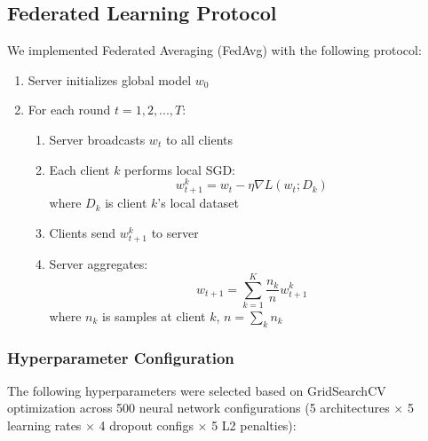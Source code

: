 \documentclass[conference]{IEEEtran}
\begin{document}
\subsection{Federated Learning Protocol}

We implemented Federated Averaging (FedAvg) \cite{mcmahan2017communication} with the following protocol:

\begin{enumerate}
    \item Server initializes global model $w_0$
    \item For each round $t = 1, 2, ..., T$:
    \begin{enumerate}
        \item Server broadcasts $w_t$ to all clients
        \item Each client $k$ performs local SGD:
        \begin{equation}
            w_{t+1}^k = w_t - \eta \nabla L(w_t; D_k)
        \end{equation}
        where $D_k$ is client $k$'s local dataset
        \item Clients send $w_{t+1}^k$ to server
        \item Server aggregates:
        \begin{equation}
            w_{t+1} = \sum_{k=1}^{K} \frac{n_k}{n} w_{t+1}^k
        \end{equation}
        where $n_k$ is samples at client $k$, $n = \sum_k n_k$
    \end{enumerate}
\end{enumerate}

\subsubsection{Hyperparameter Configuration}

The following hyperparameters were selected based on GridSearchCV optimization across 500 neural network configurations (5 architectures $\times$ 5 learning rates $\times$ 4 dropout configs $\times$ 5 L2 penalties):
\end{document}
